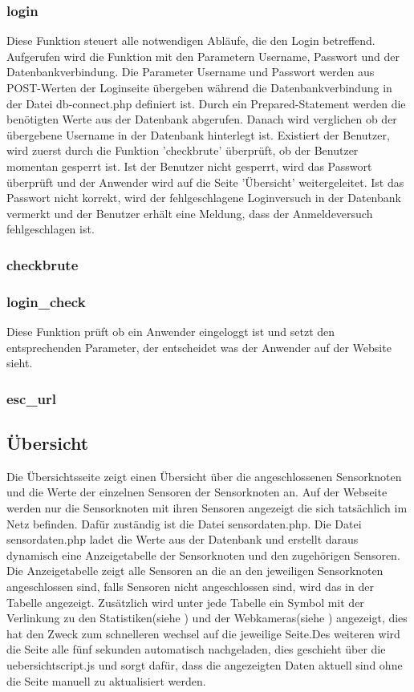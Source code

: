 \subsubsection{login}
Diese Funktion steuert alle notwendigen Abläufe, die den Login betreffend.\\
Aufgerufen wird die Funktion mit den Parametern Username, Passwort und der Datenbankverbindung. Die Parameter Username und Passwort werden aus POST-Werten der Loginseite übergeben während die Datenbankverbindung in der Datei db-connect.php definiert ist. Durch ein Prepared-Statement werden die benötigten Werte aus der Datenbank abgerufen. Danach wird verglichen ob der übergebene Username in der Datenbank hinterlegt ist. Existiert der Benutzer, wird zuerst durch die Funktion 'checkbrute' überprüft, ob der Benutzer momentan gesperrt ist. Ist der Benutzer nicht gesperrt, wird das Passwort überprüft und der Anwender wird auf die Seite 'Übersicht' weitergeleitet. Ist das Passwort nicht korrekt, wird der fehlgeschlagene Loginversuch in der Datenbank vermerkt und der Benutzer erhält eine Meldung, dass der Anmeldeversuch fehlgeschlagen ist. 

\subsubsection{checkbrute}

\subsubsection{login\_check}
Diese Funktion prüft ob ein Anwender eingeloggt ist und setzt den entsprechenden
Parameter, der entscheidet was der Anwender auf der Website sieht.

\subsubsection{esc\_url}

\subsection{Übersicht}
Die Übersichtsseite zeigt einen Übersicht über die angeschlossenen Sensorknoten und die Werte der einzelnen Sensoren der Sensorknoten an. Auf der Webseite werden nur die Sensorknoten mit ihren Sensoren angezeigt die sich tatsächlich im Netz befinden. Dafür zuständig ist die Datei sensordaten.php. Die Datei sensordaten.php ladet die Werte aus der Datenbank und erstellt daraus dynamisch eine Anzeigetabelle der Sensorknoten und den zugehörigen Sensoren. Die Anzeigetabelle zeigt alle Sensoren an die an den jeweiligen Sensorknoten angeschlossen sind, falls Sensoren nicht angeschlossen sind, wird das in der Tabelle angezeigt. Zusätzlich wird unter jede Tabelle ein Symbol mit der Verlinkung zu den Statistiken(siehe ) und der Webkameras(siehe ) angezeigt, dies hat den Zweck zum schnelleren wechsel auf die jeweilige Seite.Des weiteren wird die Seite alle fünf sekunden automatisch nachgeladen, dies geschieht über die uebersichtscript.js und sorgt dafür, dass die angezeigten Daten aktuell sind ohne die Seite manuell zu aktualisiert werden.

